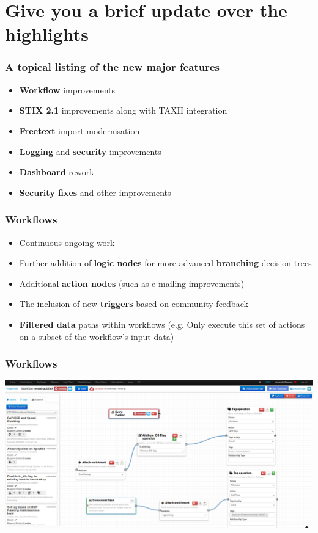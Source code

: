 \section{Give you a brief update over the highlights}

\begin{frame}
  \frametitle{A topical listing of the new major features}
  \begin{itemize}
      \item {\bf Workflow} improvements
      \item {\bf STIX 2.1} improvements along with TAXII integration
      \item {\bf Freetext} import modernisation
      \item {\bf Logging} and {\bf security} improvements
      \item {\bf Dashboard} rework
      \item {\bf Security fixes} and other improvements
  \end{itemize}
\end{frame}


\begin{frame}
  \frametitle{Workflows}
  \begin{itemize}
     \item Continuous ongoing work
     \item Further addition of {\bf logic nodes} for more advanced {\bf branching} decision trees
     \item Additional {\bf action nodes} (such as e-mailing improvements)
     \item The inclusion of new {\bf triggers} based on community feedback
     \item {\bf Filtered data} paths within workflows (e.g. Only execute this set of actions on a subset of the workflow's input data)
  \end{itemize}
\end{frame}

\begin{frame}
\frametitle{Workflows}
\begin{center}
\includegraphics[scale=0.17]{images/workflows_filtered.png}
\end{center}
\end{frame}

